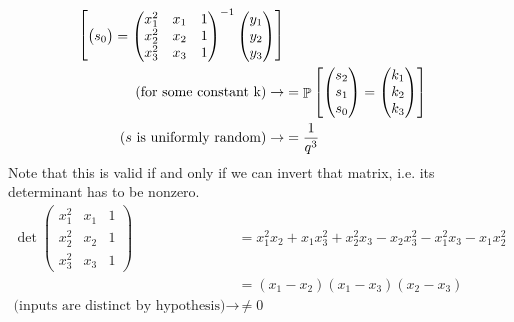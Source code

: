\begin{enumerate}[(a)]
\begin{enumerate}[(i)]
\begin{solution}
\begin{align*}
\begin{bmatrix}
\begin{pmatrix}
						            s_0
					            \end{pmatrix}
					            =
					            \begin{pmatrix}
						            x_1^2 & x_1 & 1 \\
						            x_2^2 & x_2 & 1 \\
						            x_3^2 & x_3 & 1
					            \end{pmatrix}^{-1}
					            \begin{pmatrix}
						            y_1 \\
						            y_2 \\
						            y_3
					            \end{pmatrix}
				            \end{bmatrix} \\
				            \mbox{(for some constant k)} \rightarrow     & = \P\begin{bmatrix}
					            \begin{pmatrix}
						            s_2 \\
						            s_1 \\
						            s_0
					            \end{pmatrix}
					            =
					            \begin{pmatrix}
						            k_1 \\
						            k_2 \\
						            k_3
					            \end{pmatrix}
				            \end{bmatrix} \\
				            \mbox{($s$ is uniformly random)} \rightarrow & = \frac{1}{q^3}
			            \end{align*}
			            Note that this is valid if and only if we can invert that matrix, i.e. its determinant has to be nonzero.
			            \begin{align*}
				            \det\begin{pmatrix}
					            x_1^2 & x_1 & 1 \\
					            x_2^2 & x_2 & 1 \\
					            x_3^2 & x_3 & 1
				            \end{pmatrix}                         & =
				            x_1^2x_2 + x_1x_3^2 + x_2^2x_3 - x_2x_3^2 -x_1^2x_3 - x_1x_2^2                           \\
				                                                                   & = (x_1 - x_2)(x_1-x_3)(x_2-x_3) \\
				            \mbox{(inputs are distinct by hypothesis)} \rightarrow & \ne 0
			            \end{align*}
		            \end{solution}
	      \end{enumerate}


\end{enumerate}
